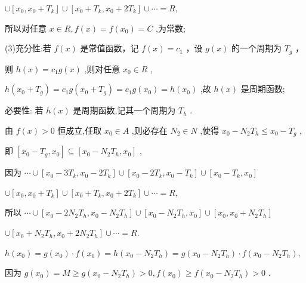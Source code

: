 \documentclass[10pt]{article}
\begin{document}
\(\cup  \left\lbrack  {{x}_{0},{x}_{0} + {T}_{k}}\right\rbrack   \cup  \left\lbrack  {{x}_{0} + {T}_{k},{x}_{0} + 2{T}_{k}}\right\rbrack   \cup  \cdots  = R,\)

所以对任意 \(x \in  R,f\left( x\right)  = f\left( {x}_{0}\right)  = C\) ,为常数;

(3)充分性:若 \(f\left( x\right)\) 是常值函数，记 \(f\left( x\right)  = {c}_{1}\) ，设 \(g\left( x\right)\) 的一个周期为 \({T}_{g}\) ，

则 \(h\left( x\right)  = {c}_{1}g\left( x\right)\) ,则对任意 \({x}_{0} \in  R\) ,

\(h\left( {{x}_{0} + {T}_{g}}\right)  = {c}_{1}g\left( {{x}_{0} + {T}_{g}}\right)  = {c}_{1}g\left( {x}_{0}\right)  = h\left( {x}_{0}\right)\) ,故 \(h\left( x\right)\) 是周期函数;

必要性: 若 \(h\left( x\right)\) 是周期函数,记其一个周期为 \({T}_{h}\) .

由 \(f\left( x\right)  > 0\) 恒成立,任取 \({x}_{0} \in  A\) ,则必存在 \({N}_{2} \in  N\) ,使得 \({x}_{0} - {N}_{2}{T}_{h} \leq  {x}_{0} - {T}_{g}\) ,

即 \(\left\lbrack  {{x}_{0} - {T}_{g},{x}_{0}}\right\rbrack   \subseteq  \left\lbrack  {{x}_{0} - {N}_{2}{T}_{h},{x}_{0}}\right\rbrack\) ,

因为 \(\cdots  \cup  \left\lbrack  {{x}_{0} - 3{T}_{k},{x}_{0} - 2{T}_{k}}\right\rbrack   \cup  \left\lbrack  {{x}_{0} - 2{T}_{k},{x}_{0} - {T}_{k}}\right\rbrack   \cup  \left\lbrack  {{x}_{0} - {T}_{k},{x}_{0}}\right\rbrack\)

\(\cup  \left\lbrack  {{x}_{0},{x}_{0} + {T}_{k}}\right\rbrack   \cup  \left\lbrack  {{x}_{0} + {T}_{k},{x}_{0} + 2{T}_{k}}\right\rbrack   \cup  \cdots  = R,\)

所以 \(\cdots  \cup  \left\lbrack  {{x}_{0} - 2{N}_{2}{T}_{h},{x}_{0} - {N}_{2}{T}_{h}}\right\rbrack   \cup  \left\lbrack  {{x}_{0} - {N}_{2}{T}_{h},{x}_{0}}\right\rbrack   \cup  \left\lbrack  {{x}_{0},{x}_{0} + {N}_{2}{T}_{h}}\right\rbrack\)

\(\cup  \left\lbrack  {{x}_{0} + {N}_{2}{T}_{h},{x}_{0} + 2{N}_{2}{T}_{h}}\right\rbrack   \cup  \cdots  = R.\)

\(h\left( {x}_{0}\right)  = g\left( {x}_{0}\right)  \cdot  f\left( {x}_{0}\right)  = h\left( {{x}_{0} - {N}_{2}{T}_{h}}\right)  = g\left( {{x}_{0} - {N}_{2}{T}_{h}}\right)  \cdot  f\left( {{x}_{0} - {N}_{2}{T}_{h}}\right) ,\)

因为 \(g\left( {x}_{0}\right)  = M \geq  g\left( {{x}_{0} - {N}_{2}{T}_{h}}\right)  > 0,f\left( {x}_{0}\right)  \geq  f\left( {{x}_{0} - {N}_{2}{T}_{h}}\right)  > 0\) .
\end{document}
